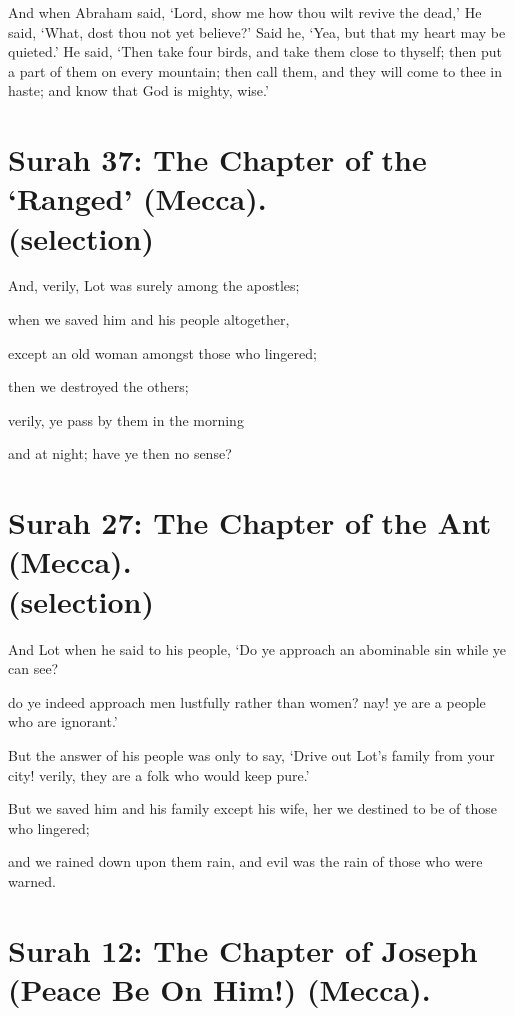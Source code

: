 \documentclass[fontsize=14pt, letterpaper, notitlepage, openany, DIV=12]{scrbook} %
\begin{document}
\noindent[2:260]
And when Abraham said, `Lord, show me how thou wilt revive the dead,' He said,
`What, dost thou not yet believe?' Said he, `Yea, but that my heart may be quieted.' He said,
`Then take four birds, and take them close to thyself; then put a part of them on every mountain;
then call them, and they will come to thee in haste; and know that God is mighty, wise.'


\section[Surah 37: The Chapter of the `Ranged' (Mecca).]{Surah 37: The Chapter of the `Ranged' (Mecca).\\ (selection)}


\noindent[37:133]
And, verily, Lot was surely among the apostles;

\noindent[37:134]
when we saved him and his people altogether,

\noindent[37:135]
except an old woman amongst those who lingered;

\noindent[37:136]
then we destroyed the others;

\noindent[37:137]
verily, ye pass by them in the morning

\noindent[37:138]
and at night; have ye then no sense?


\section[Surah 27: The Chapter of the Ant (Mecca).]{Surah 27: The Chapter of the Ant (Mecca).\\ (selection)}


\noindent[27:54]
And Lot when he said to his people, `Do ye approach an abominable sin while ye can
see?

\noindent[27:55]
do ye indeed approach men lustfully rather than women? nay! ye are a people who are
ignorant.'

\noindent[27:56]
But the answer of his people was only to say, `Drive out Lot's family from your city!
verily, they are a folk who would keep pure.'

\noindent[27:57]
But we saved him and his family except his wife, her we destined to be of those who
lingered;

\noindent[27:58]
and we rained down upon them rain, and evil was the rain of those who were warned.


\section{Surah 12: The Chapter of Joseph (Peace Be On Him!) (Mecca).}
\end{document}
